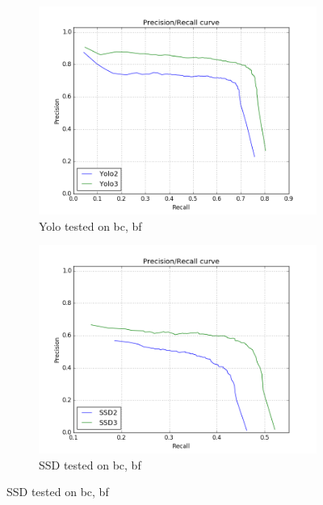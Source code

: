\begin{figure}[h!]
\begin{subfigure}{.5\textwidth}
  \centering
  \includegraphics[width=0.8\linewidth]{results/case_buildings/prec_recall/yolo/bcbf.png}
  \caption{Yolo tested on bc, bf}
  \label{fig:sfig1}
\end{subfigure}%
\begin{subfigure}{.5\textwidth}
  \centering
  \includegraphics[width=.8\linewidth]{results/case_buildings/prec_recall/ssd/bcbf.png}
  \caption{SSD tested on bc, bf}
  \label{fig:sfig2}
\end{subfigure}


\end{figure}
